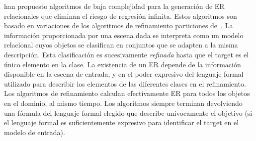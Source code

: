 

\cite{arec2:2008:Areces,arec:usin11} han propuesto algoritmos de baja complejidad
 para la generaci\'on de ER relacionales que eliminan el riesgo de regresi\'on infinita. Estos algoritmos son
basado en variaciones de los algoritmos de refinamiento particiones
de~\cite{paig:thre87}. La informaci\'on proporcionada por una escena dada
se interpreta como un modelo relacional cuyos objetos se clasifican en
conjuntos que se adapten a la misma descripci\'on. Esta clasificaci\'on es
sucesivamente \emph{refinada} hasta que el target es el \'unico elemento
en la clase. La existencia de un ER depende
de la informaci\'on disponible en la escena de entrada, y en el poder expresivo
del lenguaje formal utilizado para describir los elementos de las
diferentes clases en el refinamiento.\\


Los algoritmos de refinamiento
calculan efectivamente ER para todos los objetos en el dominio, al mismo
tiempo. Los algoritmos siempre terminan devolviendo una f\'ormula del
lenguaje formal elegido que describe un\'{i}vocamente el objetivo (si el
lenguaje formal es suficientemente expresivo para identificar el target en el
modelo de entrada).\\

